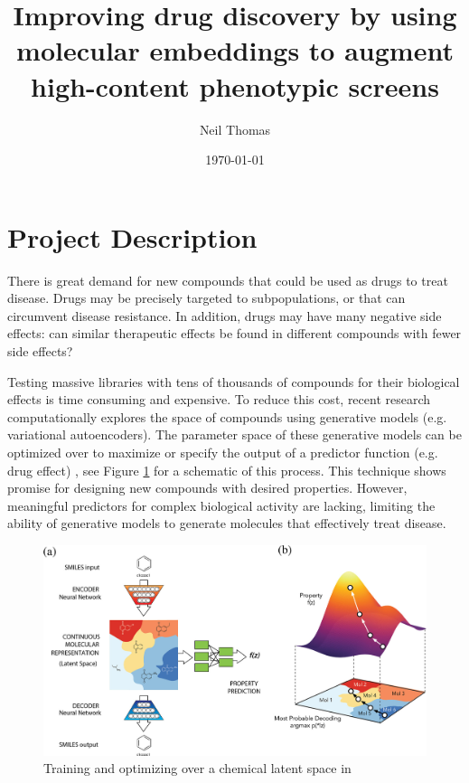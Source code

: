 \documentclass{article}
\title{Improving drug discovery by using molecular embeddings to augment high-content phenotypic screens}
\date{\today}
\author{Neil Thomas}
\begin{document}
\maketitle

\section{Project Description}

There is great demand for new compounds that could be used as drugs to treat disease. Drugs may be precisely targeted to subpopulations, or that can circumvent disease resistance. In addition, drugs may have many negative side effects: can similar therapeutic effects be found in different compounds with fewer side effects?

Testing massive libraries with tens of thousands of compounds for their biological effects is time consuming and expensive. To reduce this cost, recent research computationally explores the space of compounds using generative models (e.g. variational autoencoders). The parameter space of these generative models can be optimized over to maximize or specify the output of a predictor function (e.g. drug effect) \cite{Brookes2018} \cite{Gomez-Bombarelli2018}, see Figure \ref{chemvae} for a schematic of this process. This technique shows promise for designing new compounds with desired properties. However, meaningful predictors for complex biological activity are lacking, limiting the ability of generative models to generate molecules that effectively treat disease.

\begin{figure}[h]
\includegraphics[width=\textwidth]{figs/chemvae.jpeg}
\caption{Training and optimizing over a chemical latent space in \cite{Gomez-Bombarelli2018}}
\label{chemvae}
\end{figure}
\end{document}
